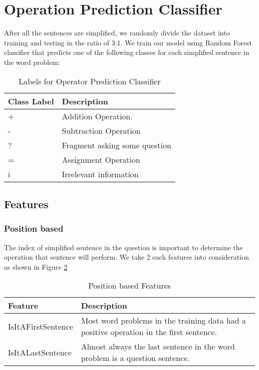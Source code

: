 \documentclass[11pt]{article}
\begin{document}
\section{Operation Prediction Classifier}

After all the sentences are simplified, we randomly divide the dataset into training and testing in the ratio of 3:1. We train our model using Random Forest classifier that predicts one of the following classes for each simplified sentence in the word problem:

\begin{table}[h!]
\centering
\begin{tabular}{ | m{2cm} | m{5cm} |}
\hline
\textbf{Class Label} & \textbf{Description}\\ \hline
+ & Addition Operation.\\ \hline
- & Subtraction Operation\\ \hline
? & Fragment asking some question\\ \hline
= & Assignment Operation\\ \hline
i & Irrelevant information \\ \hline
\end{tabular}
\caption{Labels for Operator Prediction Classifier}
\label{figure:7}
\end{table}

\subsection{Features}
\subsubsection{Position based}
The index of simplified sentence in the question is important to determine the operation that sentence will perform. We take 2 such features into consideration as shown in Figure \ref{figure:8}
\begin{table}[h!]
\centering
\begin{tabular}{ | m{3cm} | m{4cm} |}
\hline
\textbf{Feature} & \textbf{Description}\\ \hline
IsItAFirstSentence & Most word problems in the training data had a positive operation in the first sentence.\\ \hline
IsItALastSentence & Almost always the last sentence in the word problem is a question sentence.\\ \hline
\end{tabular}
\caption{Position based Features}
\label{figure:8}
\end{table}
\end{document}
